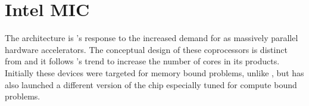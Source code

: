 \documentclass[../thesis]{subfiles}
\begin{document}
	\chapter{Intel MIC}
	\label{chp:mic}

	The \mic architecture \cite{Intel:XeonPhi:QuickStartGuide} is \intel's response to the increased demand for \gpgpus as massively parallel hardware accelerators. The conceptual design of these coprocessors is distinct from \gpgpus and it follows \intel's trend to increase the number of cores in its products. Initially these devices were targeted for memory bound problems, unlike \gpus, but \intel has also launched a different version of the chip especially tuned for compute bound problems.

	
	
	
	
	
	
\end{document}
